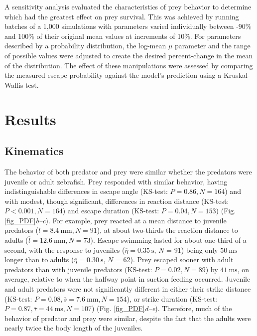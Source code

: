 \documentclass[]{rsos}%
\begin{document}
A sensitivity analysis evaluated the characteristics of prey behavior to determine which had the greatest effect on prey survival. 
This was achieved by running batches of a 1,000 simulations with parameters varied individually between -90\% and 100\% of their original mean values at increments of 10\%.
For parameters described by a probability distribution, the log-mean $\mu$ parameter and the range of possible values were adjusted to create the desired percent-change in the mean of the distribution.
The effect of these manipulations were assessed by comparing the measured escape probability against the model's prediction using a Kruskal-Wallis test. 



\section{Results} %

\subsection{Kinematics} %
The behavior of both predator and prey were similar whether the predators were juvenile or adult zebrafish.
Prey responded with similar behavior, having indistinguishable differences in escape angle (KS-test: $P = 0.86, N = 164$) and with modest, though significant, differences in reaction distance (KS-test: $P < 0.001, N = 164$) and escape duration (KS-test: $P = 0.04, N = 153$) (Fig. \ref{fig_PDF}\textit{b--c}). 
For example, prey reacted at a mean distance to juvenile predators ($\overline{l} = \SI{8.4}{\mm}, N = 91$), at about two-thirds the reaction distance to adults ($\overline{l} = \SI{12.6}{\mm}, N = 73$).
Escape swimming lasted for about one-third of a second, with the response to juveniles ($\overline{\eta} = \SI{0.35}{\s}$, $N$ = 91) being only  $\SI{50}{\ms}$ longer than to adults ($\overline{\eta} = \SI{0.30}{\s}$, $N$ = 62).
Prey escaped sooner with adult predators than with juvenile predators (KS-test: $P = 0.02, N = 89$) by $\SI{41}{\ms}$, on average, relative to when the halfway point in suction feeding occurred.
Juvenile and adult predators were not significantly different in either their strike distance (KS-test: $P = 0.08, \overline{s} = \SI{7.6}{\mm}, N = 154$), or strike duration (KS-test: $P = 0.87, \overline{\tau} = \SI{44}{\ms}, N = 107$) (Fig. \ref{fig_PDF}\textit{d--e}).
Therefore, much of the behavior of predator and prey were similar, despite the fact that the adults were nearly twice the body length of the juveniles.
\end{document}
